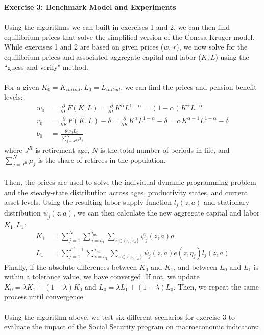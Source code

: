 \documentclass[12pt]{article}
\begin{document}
\noindent \textbf{Exercise 3: Benchmark Model and Experiments} \\\\
Using the algorithms we can built in exercises 1 and 2, we can then find equilibrium prices that solve the simplified version of the Conesa-Kruger model. While exercises 1 and 2 are based on given prices ($w$, $r$), we now solve for the equilibrium prices and associated aggregate capital and labor ($K, L$) using the ``guess and verify" method. \\\\
For a given $K_0 = K_{initial}, L_0 = L_{initial}$, we can find the prices and pension benefit levels:
\begin{align*}
    w_0 &= \frac{\partial}{\partial L} F(K, L) = \frac{\partial}{\partial L} K^{\alpha}L^{1-\alpha} = (1-\alpha) K^{\alpha} L^{-\alpha}
    \\
    r_0 &= \frac{\partial}{\partial K} F(K, L) - \delta = \frac{\partial}{\partial K} K^{\alpha}L^{1-\alpha} - \delta = \alpha K^{\alpha -1} L^{1-\alpha} - \delta\\
    b_0 &= \frac{\theta w_0 L_0}{\sum_{j = J^R}^N \mu_j}
\end{align*}
where $J^R$ is retirement age, $N$ is the total number of periods in life, and $\sum_{j = J^R}^N \mu_j$ is the share of retirees in the population. \\\\
Then, the prices are used to solve the individual dynamic programming problem and the steady-state distribution across ages, productivity states, and current asset levels. Using the resulting labor supply function $l_j(z, a)$ and stationary distribution $\psi_j(z, a)$, we can then calculate the new aggregate capital and labor $K_1, L_1$:
\begin{align*}
    K_1 &= \sum_{j=1}^N \sum_{a = a_1}^{a_{na}} \sum_{z \in \{z_l, z_h\}} \psi_j(z, a)a \\
    L_1 &= \sum_{j=1}^{J^R -1} \sum_{a = a_1}^{a_{na}} \sum_{z \in \{z_l, z_h\}} \psi_j(z, a) e(z, \eta_j) l_j(z, a)
\end{align*}
Finally, if the absolute differences between $K_0$ and $K_1$, and between $L_0$ and $L_1$ is within a tolerance value, we have converged. If not, we update $K_0 = \lambda K_1 + (1-\lambda)K_0$ and $L_0 = \lambda L_1 + (1-\lambda)L_0$. Then, we repeat the same process until convergence. \\\\
Using the algorithm above, we test six different scenarios for exercise 3 to evaluate the impact of the Social Security program on macroeconomic indicators: 
\end{document}
